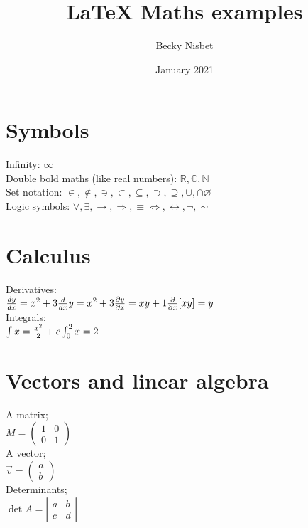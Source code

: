 \documentclass{article}
\title{\LaTeX{} Maths examples}
\author{Becky Nisbet}
\date{January 2021}
\begin{document}
\maketitle

\section{Symbols}
Infinity: $\infty$\\
Double bold maths (like real numbers): $\mathbb{R}, \mathbb{C}, \mathbb{N}$ \\ %
Set notation: $\in, \notin, \ni, \subset, \subseteq, \supset, \supseteq, \cup, \cap \varnothing$\\
Logic symbols: $\forall, \exists, \rightarrow, \Rightarrow, \equiv \iff, \leftrightarrow, \neg, \sim$

\section{Calculus}
Derivatives:\\
$\frac{dy}{dx} =x^2+3\\
\frac{d}{dx}y=x^2+3\\
\frac{\partial y}{\partial x}=xy+1\\
\frac{\partial}{\partial x}[xy]=y$\\
Integrals:\\
$\int x = \frac{x^2}{2}+c\\
\int_0^2 x = 2$

\section{Vectors and linear algebra}
A matrix;\\
$M = \left( %
\begin{array}{cc}
    
    1 & 0 \\
    0 & 1
\end{array}
\right)$\\
A vector;\\
$\vec{v}=\left(
\begin{array}{c}
    a \\
    b
\end{array}
\right)$ \\%
Determinants;\\
$\det{A} =
\left|
\begin{array}{cc}
    a & b \\
    c & d
\end{array}
\right|$
\end{document}
